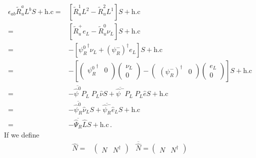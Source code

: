 \begin{align*}
  \epsilon_{ab}\widetilde{R}_{u}^a L^b S +\text{h.c}=
&\left[\widetilde{R}_u^1 L^2- \widetilde{R}_u^2 L^1 \right]S+\text{h.c}\nonumber\\
=&\left[ \widetilde{R}_u^+ e_L -\widetilde{R}_u^0 \nu_L\right]S+\text{h.c}\nonumber\\
=&-\left[ {\psi_{R}^0}^{\dagger}\nu_L  
+\left(\psi_{R}^-\right)^{\dagger} e_L    
 \right]S+\text{h.c} \nonumber\\
=&-\left[   \begin{pmatrix}
  {\psi_{R}^0}^{\dagger} &0\\
\end{pmatrix}
\begin{pmatrix}
\nu_L\\
0
\end{pmatrix}-  \begin{pmatrix}
   \left( \psi_{R}^- \right)^{\dagger} & 0
  \end{pmatrix}
  \begin{pmatrix}
    e_L\\ 
    0
  \end{pmatrix}
 \right]S +\text{h.c}\nonumber\\
=&-\overline{\widehat{\psi}^0}P_L\; P_L\widehat{\nu}S 
+\overline{\widehat{\psi}^-}P_L\;P_L\widehat{e}S
+\text{h.c}\nonumber\\
=&-\overline{\widehat{\psi}_{R}^0}\widehat{\nu}_LS
+\overline{\widehat{\psi}_{R}^-}\widehat{e}_LS
+\text{h.c}\nonumber\\
=&-\overline{\widehat{\Psi}_{R}} {\widehat{L}} S+\text{h.c}\,.
\end{align*}
If we define
\begin{align}
\label{eq:NM}
\widehat{N}=&
\begin{pmatrix}
  N & N^{\dagger}
\end{pmatrix}&
\overline{\widehat{N}}=
\begin{pmatrix}
N & N^{\dagger}   
\end{pmatrix}
\end{align}

